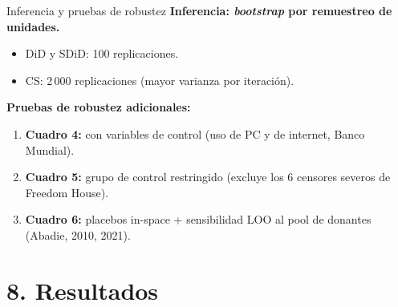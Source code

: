 \documentclass[10pt,aspectratio=169]{beamer}
\begin{document}
\begin{frame}{Inferencia y pruebas de robustez}
\textbf{Inferencia: \textit{bootstrap} por remuestreo de unidades.}
\begin{itemize}
  \item DiD y SDiD: 100 replicaciones.
  \item CS: 2\,000 replicaciones (mayor varianza por iteración).
\end{itemize}

\vspace{0.5em}
\textbf{Pruebas de robustez adicionales:}
\begin{enumerate}
  \item \textbf{Cuadro 4:} con variables de control (uso de PC y de internet, Banco Mundial).
  \item \textbf{Cuadro 5:} grupo de control restringido (excluye los 6 censores severos de Freedom House).
  \item \textbf{Cuadro 6:} \alert{placebos in-space + sensibilidad LOO al pool de donantes} (Abadie, 2010, 2021).
\end{enumerate}
\end{frame}

\section{8. Resultados}
\end{document}
